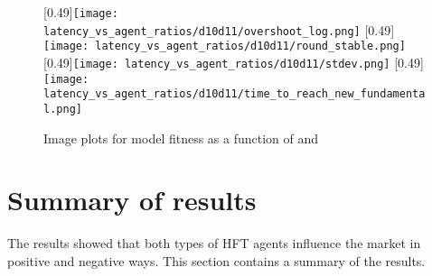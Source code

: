  \begin{figure}
 	\centering
 	\subcaptionbox{\overshoot}[0.49\linewidth]{\texttt{[image: latency\_vs\_agent\_ratios/d10d11/overshoot\_log.png]}}
 	\subcaptionbox{\roundstable}[0.49\linewidth]{\texttt{[image: latency\_vs\_agent\_ratios/d10d11/round\_stable.png]}}
 	\subcaptionbox{\stdev}[0.49\linewidth]{\texttt{[image: latency\_vs\_agent\_ratios/d10d11/stdev.png]}}
 	\subcaptionbox{\timetoreachnewfundamental}[0.49\linewidth]{\texttt{[image: latency\_vs\_agent\_ratios/d10d11/time\_to\_reach\_new\_fundamental.png]}}
	\caption{Image plots for model fitness as a function of \ratioagents{} and \ratiolatency}
 	\label{fig:ratio_image}
 \end{figure}


 



\section{Summary of results}
The results showed that both types of HFT agents influence the market in positive and negative ways. This section contains a summary of the results.



